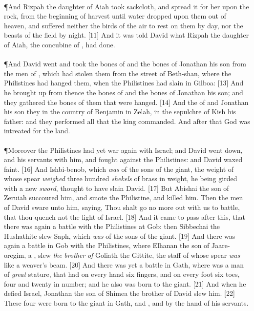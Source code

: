 \\
\P \textcolor[cmyk]{0.99998,1,0,0}{And Rizpah the daughter of Aiah took sackcloth, and spread it for her upon the rock, from the beginning of harvest until water dropped upon them out of heaven, and suffered neither the birds of the air to rest on them by day, nor the beasts of the field by night.}
[11] \textcolor[cmyk]{0.99998,1,0,0}{And it was told David what Rizpah the daughter of Aiah, the concubine of , had done.}\\
\\
\P \textcolor[cmyk]{0.99998,1,0,0}{And David went and took the bones of  and the bones of Jonathan his son from the men of , which had stolen them from the street of Beth-shan, where the Philistines had hanged them, when the Philistines had slain  in Gilboa:}
[13] \textcolor[cmyk]{0.99998,1,0,0}{And he brought up from thence the bones of  and the bones of Jonathan his son; and they gathered the bones of them that were hanged.}
[14] \textcolor[cmyk]{0.99998,1,0,0}{And the  of  and Jonathan his son  they in the country of Benjamin in Zelah, in the sepulchre of Kish his father: and they performed all that the king commanded. And after that God was intreated for the land.}\\
\\
\P \textcolor[cmyk]{0.99998,1,0,0}{Moreover the Philistines had yet war again with Israel; and David went down, and his servants with him, and fought against the Philistines: and David waxed faint.}
[16] \textcolor[cmyk]{0.99998,1,0,0}{And Ishbi-benob, which \emph{was} of the sons of the giant, the weight of whose spear \emph{weighed} three hundred \emph{shekels} of brass in weight, he being girded with a new \emph{sword}, thought to have slain David.}
[17] \textcolor[cmyk]{0.99998,1,0,0}{But Abishai the son of Zeruiah succoured him, and smote the Philistine, and killed him. Then the men of David sware unto him, saying, Thou shalt go no more out with us to battle, that thou quench not the light of Israel.}
[18] \textcolor[cmyk]{0.99998,1,0,0}{And it came to pass after this, that there was again a battle with the Philistines at Gob: then Sibbechai the Hushathite slew Saph, which \emph{was} of the sons of the giant.}
[19] \textcolor[cmyk]{0.99998,1,0,0}{And there was again a battle in Gob with the Philistines, where Elhanan the son of Jaare-oregim, a , slew \emph{the} \emph{brother} \emph{of} Goliath the Gittite, the staff of whose spear \emph{was} like a weaver's beam.}
[20] \textcolor[cmyk]{0.99998,1,0,0}{And there was yet a battle in Gath, where was a man of \emph{great} stature, that had on every hand six fingers, and on every foot six toes, four and twenty in number; and he also was born to the giant.}
[21] \textcolor[cmyk]{0.99998,1,0,0}{And when he defied Israel, Jonathan the son of Shimea the brother of David slew him.}
[22] \textcolor[cmyk]{0.99998,1,0,0}{These four were born to the giant in Gath, and , and by the hand of his servants.}